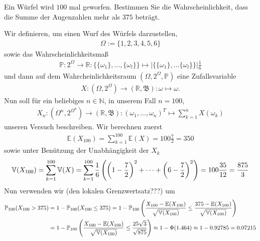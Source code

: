 \begin{exercise}

Ein Würfel wird $100$ mal geworfen. Bestimmen Sie die Wahrscheinlichkeit, dass die Summe der Augenzahlen mehr als $375$ beträgt.

\end{exercise}

\begin{solution}

Wir definieren, um einen Wurf des Würfels darzustellen,
\begin{align*}
    \Omega := \{1,2,3,4,5,6\}
\end{align*}
sowie das Wahrscheinlichkeitsmaß
\begin{align*}
    \mathbb{P}:2^\Omega \to \mathbb{R}: \{\{\omega_1\},\dots,\{\omega_l\}\} \mapsto \vert \{\{\omega_1\},\dots\{\omega_l\}\} \vert \frac{1}{6}
\end{align*}
und dann auf dem Wahrcheinlichkeitsraum $(\Omega,2^\Omega,\mathbb{P})$ eine Zufallsvariable
\begin{align*}
    X:(\Omega,2^\Omega) \to (\mathbb{R},\mathfrak{B}): \omega \mapsto \omega.
\end{align*}
Nun soll für ein beliebiges $n \in \mathbb{N}$, in unserem Fall $n=100$,
\begin{align*}
    X_n:(\Omega^n,2^{\Omega^n}) \to (\mathbb{R},\mathfrak{B}): (\omega_1,\dots,\omega_n)^T \mapsto \sum_{k=1}^{n} X(\omega_k)
\end{align*}
unseren Versuch beschreiben. Wir berechnen zuerst
\begin{align*}
    \mathbb{E}(X_{100}) = \sum_{k=1}^{100} \mathbb{E}(X) = 100\frac{7}{2} = 350
\end{align*}
sowie unter Benützung der Unabhängigkeit der $X_k$
\begin{align*}
    \mathbb{V}(X_{100}) = \sum_{k=1}^{100} \mathbb{V}(X) = \sum_{k=1}^{100} \frac{1}{6} \left ( \left ( 1-\frac{7}{2} \right )^2+\cdots+\left ( 6-\frac{7}{2} \right )^2 \right ) = 100 \frac{35}{12} = \frac{875}{3}
\end{align*}
Nun verwenden wir (den lokalen Grenzwertsatz???) um
\begin{align*}
    \mathbb{P}_{100}(X_{100} > 375) &= 1 - \mathbb{P}_{100}(X_{100} \leq 375) = 1 - \mathbb{P}_{100}\left ( \frac{X_{100} - \mathbb{E}(X_{100})}{\sqrt{\mathbb{V}(X_{100})}} \leq \frac{375 - \mathbb{E}(X_{100})}{\sqrt{\mathbb{V}(X_{100})}} \right ) \\
    &= 1 - \mathbb{P}_{100}\left ( \frac{X_{100} - \mathbb{E}(X_{100})}{\sqrt{\mathbb{V}(X_{100})}} \leq \frac{25\sqrt{3}}{\sqrt{875}} \right ) \approx 1 - \Phi(1.464) \approx 1 - 0.92785 = 0.07215
\end{align*}
\end{solution}
